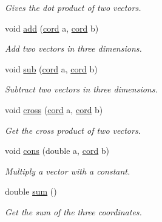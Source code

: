\begin{DoxyCompactItemize}
\begin{DoxyCompactList}\small\item\em Gives the dot product of two vectors. \end{DoxyCompactList}\item 
\hypertarget{classcord_a9f2f6cbe234431b84c1e3e611aaaf3bf}{void \hyperlink{classcord_a9f2f6cbe234431b84c1e3e611aaaf3bf}{add} (\hyperlink{classcord}{cord} a, \hyperlink{classcord}{cord} b)}\label{classcord_a9f2f6cbe234431b84c1e3e611aaaf3bf}

\begin{DoxyCompactList}\small\item\em Add two vectors in three dimensions. \end{DoxyCompactList}\item 
\hypertarget{classcord_a619b12b05eb617e823127006a00c1a22}{void \hyperlink{classcord_a619b12b05eb617e823127006a00c1a22}{sub} (\hyperlink{classcord}{cord} a, \hyperlink{classcord}{cord} b)}\label{classcord_a619b12b05eb617e823127006a00c1a22}

\begin{DoxyCompactList}\small\item\em Subtract two vectors in three dimensions. \end{DoxyCompactList}\item 
\hypertarget{classcord_ab119a32cd05ad83134657211f8314e01}{void \hyperlink{classcord_ab119a32cd05ad83134657211f8314e01}{cross} (\hyperlink{classcord}{cord} a, \hyperlink{classcord}{cord} b)}\label{classcord_ab119a32cd05ad83134657211f8314e01}

\begin{DoxyCompactList}\small\item\em Get the cross product of two vectors. \end{DoxyCompactList}\item 
\hypertarget{classcord_a6d406e65cd132ff539e992f8fe8b195e}{void \hyperlink{classcord_a6d406e65cd132ff539e992f8fe8b195e}{cons} (double a, \hyperlink{classcord}{cord} b)}\label{classcord_a6d406e65cd132ff539e992f8fe8b195e}

\begin{DoxyCompactList}\small\item\em Multiply a vector with a constant. \end{DoxyCompactList}\item 
\hypertarget{classcord_a14fc4eaa720346dfd3e055dd760657aa}{double \hyperlink{classcord_a14fc4eaa720346dfd3e055dd760657aa}{sum} ()}\label{classcord_a14fc4eaa720346dfd3e055dd760657aa}

\begin{DoxyCompactList}\small\item\em Get the sum of the three coordinates. \end{DoxyCompactList}\end{DoxyCompactItemize}
